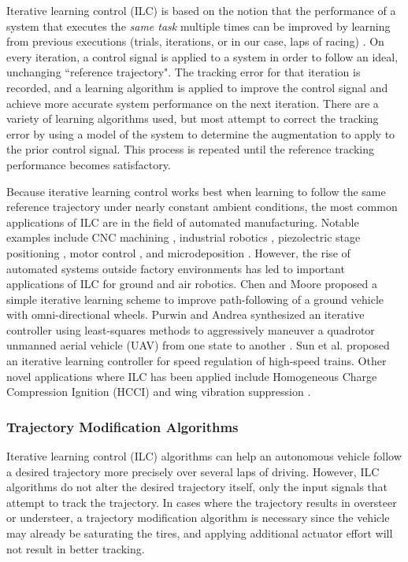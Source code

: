 \documentclass[9pt,shortpaper,twoside,web]{ieeecolor}
\begin{document}
Iterative learning control (ILC) is based on the notion that the performance of a system that executes the \textit{same task} multiple times can be improved by learning from previous executions (trials, iterations, or in our case, laps of racing) \cite{bristow}.
On every iteration, a control signal is applied to a system in order to follow an ideal, unchanging ``reference trajectory". 
The tracking error for that iteration is recorded, and a learning algorithm is applied to improve the control signal and achieve
more accurate system performance on the next iteration. There are a variety of learning algorithms used, but most attempt to correct the tracking error by using a model of the system to determine the augmentation to apply to the prior control signal. This process is repeated until the reference tracking performance becomes satisfactory.

Because iterative learning control works best when learning to follow the same reference trajectory under nearly constant ambient conditions, the most common applications of ILC are in the field of automated manufacturing. Notable examples include CNC machining \cite{kimdi}, industrial robotics \cite{freeman}\cite{hladowski}, piezolectric stage positioning \cite{huang}, motor control \cite{mohammad}, and microdeposition \cite{hoelzle}. However, the rise of automated systems outside factory environments has led to important applications of ILC for ground and air robotics. Chen and Moore \cite{chen} proposed a simple iterative learning scheme to improve path-following of a ground vehicle with omni-directional wheels. Purwin and Andrea synthesized an iterative controller using least-squares methods to aggressively maneuver a quadrotor unmanned aerial vehicle (UAV) from one state to another \cite{purwin}. Sun et al. \cite{sun} proposed an iterative learning controller for speed regulation of high-speed trains. Other novel applications where ILC has been applied include Homogeneous Charge Compression Ignition (HCCI) \cite{slepicka2016iterative} and wing vibration suppression \cite{xu2015iterative}.  

\subsubsection{Trajectory Modification Algorithms}

Iterative learning control (ILC) algorithms can help an autonomous vehicle follow a desired trajectory more precisely over several laps of driving. However, ILC algorithms do not alter the desired trajectory itself, only the input signals that attempt to track the trajectory. In cases where the trajectory results in oversteer or understeer, a trajectory modification algorithm is necessary since the vehicle may already be saturating the tires, and applying additional actuator effort will not result in better tracking.
\end{document}
